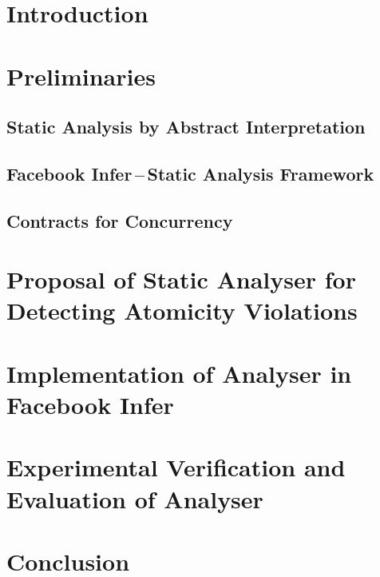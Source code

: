 

\chapter{Introduction}

\cite{Pravidla}



\chapter{Preliminaries}

\section{Static Analysis by Abstract Interpretation}


\section{Facebook Infer\,--\,Static Analysis Framework}


\section{Contracts for Concurrency}



\chapter{Proposal of Static Analyser for Detecting Atomicity Violations}



\chapter{Implementation of Analyser in Facebook Infer}



\chapter{Experimental Verification and Evaluation of Analyser}



\chapter{Conclusion}



